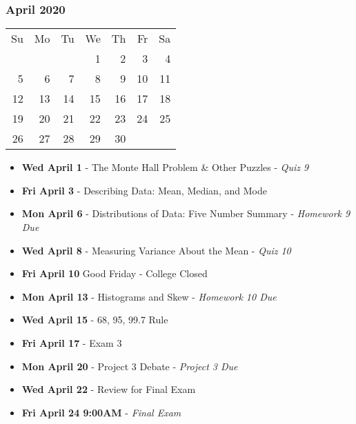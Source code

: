 \subsubsection*{April 2020}
\begin{tabular}{rrrrrrr}
Su & Mo & Tu & We & Th & Fr & Sa\\
   &    &    &  1 &  2 &  3 &  4\\
 5 &  6 &  7 &  8 &  9 & 10 & 11\\ \cline{6-6}
12 & 13 & 14 & 15 & 16 & \multicolumn{1}{|r|}{17} & 18\\ \cline{6-6}
19 & 20 & 21 & 22 & 23 & \multicolumn{1}{|r|}{24} & 25\\ \cline{6-6}
26 & 27 & 28 & 29 & 30 &    &\\ 
\end{tabular}
\begin{itemize}
\item\textbf{Wed April  1}
  - The Monte Hall Problem \& Other Puzzles - {\em Quiz 9}
\item\textbf{Fri April  3}
  - Describing Data: Mean, Median, and Mode 
\item\textbf{Mon April  6}
  - Distributions of Data: Five Number Summary - {\em Homework 9 Due}
\item\textbf{Wed April  8}
  - Measuring Variance About the Mean - {\em Quiz 10}
\item\textbf{Fri April 10} Good Friday - College Closed
\item\textbf{Mon April 13}
  - Histograms and Skew  - {\em Homework 10 Due}
\item\textbf{Wed April 15}
  - 68, 95, 99.7 Rule 
\item\textbf{Fri April 17}
  - Exam 3
\item\textbf{Mon April 20}
  - Project 3 Debate - {\em Project 3 Due}
\item\textbf{Wed April 22}
  - Review for Final Exam
\item\textbf{Fri April 24 9:00AM} - {\em Final Exam}
\end{itemize}
\hrulefill
